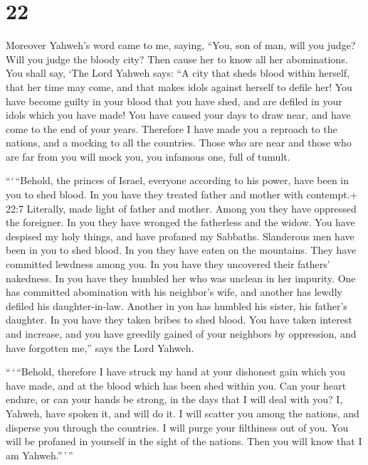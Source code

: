 \hypertarget{section-20}{%
\section{22}\label{section-20}}

 Moreover Yahweh's word came to me, saying, 
``You, son of man, will you judge? Will you judge the bloody city? Then
cause her to know all her abominations.  You shall say, `The
Lord Yahweh says: ``A city that sheds blood within herself, that her
time may come, and that makes idols against herself to defile her!
 You have become guilty in your blood that you have shed,
and are defiled in your idols which you have made! You have caused your
days to draw near, and have come to the end of your years. Therefore I
have made you a reproach to the nations, and a mocking to all the
countries.  Those who are near and those who are far from
you will mock you, you infamous one, full of tumult.

 ```\,``Behold, the princes of Israel, everyone according to
his power, have been in you to shed blood.  In you have they
treated father and mother with contempt.+ 22:7 Literally, made light of
father and mother. Among you they have oppressed the foreigner. In you
they have wronged the fatherless and the widow.  You have
despised my holy things, and have profaned my Sabbaths. 
Slanderous men have been in you to shed blood. In you they have eaten on
the mountains. They have committed lewdness among you.  In
you have they uncovered their fathers' nakedness. In you have they
humbled her who was unclean in her impurity.  One has
committed abomination with his neighbor's wife, and another has lewdly
defiled his daughter-in-law. Another in you has humbled his sister, his
father's daughter.  In you have they taken bribes to shed
blood. You have taken interest and increase, and you have greedily
gained of your neighbors by oppression, and have forgotten me,'' says
the Lord Yahweh.

 ``\,`\,``Behold, therefore I have struck my hand at your
dishonest gain which you have made, and at the blood which has been shed
within you.  Can your heart endure, or can your hands be
strong, in the days that I will deal with you? I, Yahweh, have spoken
it, and will do it.  I will scatter you among the nations,
and disperse you through the countries. I will purge your filthiness out
of you.  You will be profaned in yourself in the sight of
the nations. Then you will know that I am Yahweh.''\,'\,''

